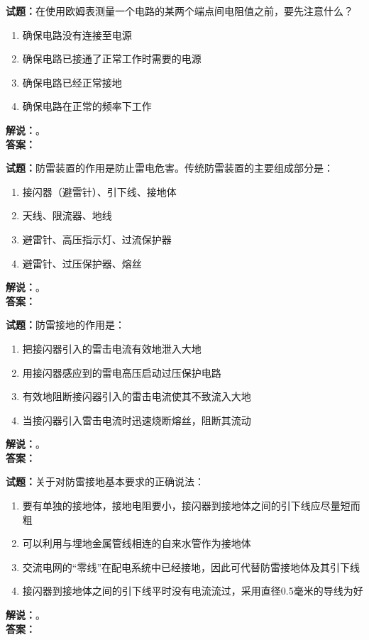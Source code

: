 \documentclass{ctexbook}
\begin{document}
\vspace{\baselineskip}

\noindent\textbf{试题：}在使用欧姆表测量一个电路的某两个端点间电阻值之前，要先注意什么？
\begin{enumerate}[leftmargin=3em]
  \item 确保电路没有连接至电源
  \item 确保电路已接通了正常工作时需要的电源
  \item 确保电路已经正常接地
  \item 确保电路在正常的频率下工作
\end{enumerate}
\noindent\textbf{解说：}\textbf{}。\\\noindent\textbf{答案：}

\vspace{\baselineskip}

\noindent\textbf{试题：}防雷装置的作用是防止雷电危害。传统防雷装置的主要组成部分是：
\begin{enumerate}[leftmargin=3em]
  \item 接闪器（避雷针）、引下线、接地体
  \item 天线、限流器、地线
  \item 避雷针、高压指示灯、过流保护器
  \item 避雷针、过压保护器、熔丝
\end{enumerate}
\noindent\textbf{解说：}\textbf{}。\\\noindent\textbf{答案：}

\vspace{\baselineskip}

\noindent\textbf{试题：}防雷接地的作用是：
\begin{enumerate}[leftmargin=3em]
  \item 把接闪器引入的雷击电流有效地泄入大地
  \item 用接闪器感应到的雷电高压启动过压保护电路
  \item 有效地阻断接闪器引入的雷击电流使其不致流入大地
  \item 当接闪器引入雷击电流时迅速烧断熔丝，阻断其流动
\end{enumerate}
\noindent\textbf{解说：}\textbf{}。\\\noindent\textbf{答案：}

\vspace{\baselineskip}

\noindent\textbf{试题：}关于对防雷接地基本要求的正确说法：
\begin{enumerate}[leftmargin=3em]
  \item 要有单独的接地体，接地电阻要小，接闪器到接地体之间的引下线应尽量短而粗
  \item 可以利用与埋地金属管线相连的自来水管作为接地体
  \item 交流电网的“零线”在配电系统中已经接地，因此可代替防雷接地体及其引下线
  \item 接闪器到接地体之间的引下线平时没有电流流过，采用直径0.5毫米的导线为好
\end{enumerate}
\noindent\textbf{解说：}\textbf{}。\\\noindent\textbf{答案：}
\end{document}
